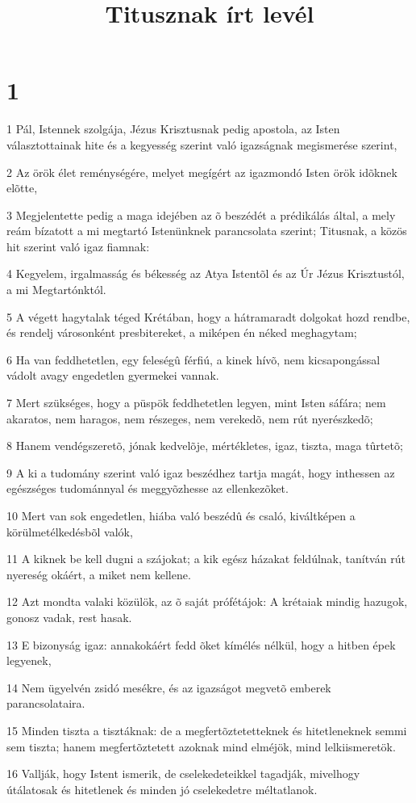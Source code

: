 

\title{Titusznak írt levél}


\chapter{1}

\par 1 Pál, Istennek szolgája, Jézus Krisztusnak pedig apostola, az Isten választottainak hite és a kegyesség szerint való igazságnak megismerése szerint,
\par 2 Az örök élet reménységére, melyet megígért az igazmondó Isten örök idõknek elõtte,
\par 3 Megjelentette pedig a maga idejében az õ beszédét a prédikálás által, a mely reám bízatott  a mi megtartó Istenünknek parancsolata szerint; Titusnak, a közös hit szerint való igaz fiamnak:
\par 4 Kegyelem, irgalmasság és békesség az Atya Istentõl és az Úr Jézus Krisztustól, a mi Megtartónktól.
\par 5 A végett hagytalak téged Krétában, hogy a hátramaradt dolgokat hozd rendbe, és rendelj városonként presbitereket, a miképen én néked meghagytam;
\par 6 Ha van feddhetetlen, egy feleségû férfiú, a kinek hívõ, nem kicsapongással vádolt avagy engedetlen gyermekei vannak.
\par 7 Mert szükséges, hogy a püspök feddhetetlen legyen, mint Isten sáfára; nem akaratos, nem haragos, nem részeges, nem verekedõ, nem rút nyerészkedõ;
\par 8 Hanem vendégszeretõ, jónak kedvelõje, mértékletes, igaz, tiszta, maga tûrtetõ;
\par 9 A ki a tudomány szerint való igaz beszédhez tartja magát, hogy inthessen az egészséges tudománnyal és meggyõzhesse az ellenkezõket.
\par 10 Mert van sok engedetlen, hiába való beszédû és csaló, kiváltképen a körülmetélkedésbõl valók,
\par 11 A kiknek be kell dugni a szájokat; a kik egész házakat feldúlnak, tanítván rút nyereség okáért, a miket nem kellene.
\par 12 Azt mondta valaki közülök, az õ saját prófétájok: A krétaiak mindig hazugok, gonosz vadak, rest hasak.
\par 13 E bizonyság igaz: annakokáért fedd õket kímélés nélkül, hogy a hitben épek legyenek,
\par 14 Nem ügyelvén zsidó mesékre, és az igazságot megvetõ emberek parancsolataira.
\par 15 Minden tiszta a tisztáknak: de a megfertõztetetteknek és hitetleneknek semmi sem tiszta; hanem megfertõztetett azoknak mind elméjök, mind lelkiismeretök.
\par 16 Vallják, hogy Istent ismerik, de cselekedeteikkel tagadják, mivelhogy útálatosak és hitetlenek és minden jó cselekedetre méltatlanok.

